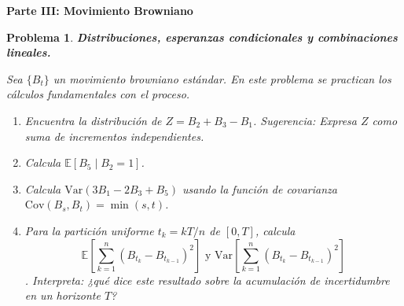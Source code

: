 \documentclass[12pt]{article}
\newtheorem{problem}{Problema}
\begin{document}


%
%

\bigskip

\noindent\textbf{\large Parte III: Movimiento Browniano}

\bigskip

\begin{problem}
\textbf{Distribuciones, esperanzas condicionales y combinaciones lineales.}

Sea $\{B_t\}$ un movimiento browniano estándar. En este problema se practican los cálculos fundamentales con el proceso.

\begin{enumerate}
    \item[(a)] Encuentra la distribución de $Z = B_2 + B_3 - B_1$. \textit{Sugerencia:} Expresa $Z$ como suma de incrementos independientes.

    \item[(b)] Calcula $\mathbb{E}[B_5 \mid B_2 = 1]$. 
    
    \item[(c)] Calcula $\mathrm{Var}(3B_1 - 2B_3 + B_5)$ usando la función de covarianza $\mathrm{Cov}(B_s, B_t) = \min(s,t)$.

    \item[(d)] Para la partición uniforme $t_k = kT/n$ de $[0,T]$, calcula $$\mathbb{E}\!\left[\sum_{k=1}^n (B_{t_k} - B_{t_{k-1}})^2\right] \text{ y } \mathrm{Var}\!\left[\sum_{k=1}^n (B_{t_k} - B_{t_{k-1}})^2\right]$$. Interpreta: ¿qué dice este resultado sobre la acumulación de incertidumbre en un horizonte $T$?
\end{enumerate}
\end{problem}
\end{document}

